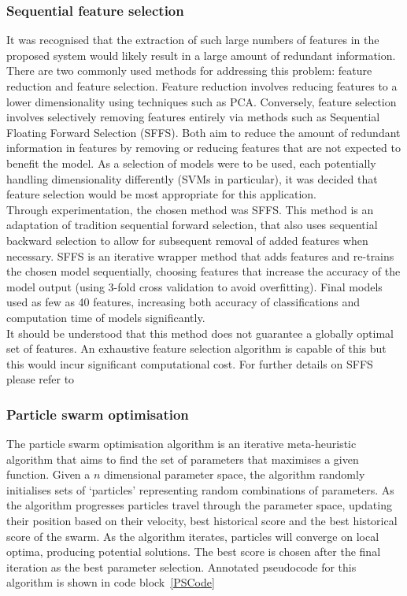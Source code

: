 \documentclass[titlepage, 12pt]{scrartcl} \usepackage{enumitem}
\begin{document}
\subsubsection{Sequential feature selection}\label{SFS}
It was recognised that the extraction of such large numbers of features in the
proposed system would likely result in a large amount of redundant information.
There are two commonly used methods for addressing this problem: feature
reduction and feature selection. Feature reduction involves reducing features
to a lower dimensionality using techniques such as PCA. Conversely, feature
selection involves selectively removing features entirely via methods such as
Sequential Floating Forward Selection (SFFS). Both aim to reduce the amount of
redundant information in features by removing or reducing features that are not
expected to benefit the model. As a selection of models were to be used, each
potentially handling dimensionality differently (SVMs in particular), it was
decided that feature selection would be most appropriate for this
application.\\

Through experimentation, the chosen method was SFFS. This method is an adaptation
of tradition sequential forward selection, that also uses sequential backward
selection to allow for subsequent removal of added features when necessary.
SFFS is an iterative wrapper method that adds features and re-trains the chosen
model sequentially, choosing features that increase the accuracy of the model
output (using 3-fold cross validation to avoid overfitting). Final models used
as few as 40 features, increasing both accuracy of classifications and
computation time of models significantly.\\
It should be understood that this method does not guarantee a globally optimal
set of features. An exhaustive feature selection algorithm is capable of this
but this would incur significant computational cost. For further details on
SFFS please refer to~\parencite[p.3]{Ferri1994}

\subsubsection{Particle swarm optimisation}\label{PSOp}
The particle swarm optimisation algorithm is an iterative meta-heuristic algorithm that
aims to find the set of parameters that maximises a given function. Given a
$n$ dimensional parameter space, the algorithm randomly initialises sets of
`particles' representing random combinations of parameters. As the algorithm
progresses particles travel through the parameter space, updating their
position based on their velocity, best historical score and the best historical
score of the swarm. As the algorithm iterates, particles will converge on local
optima, producing potential solutions. The best score is chosen after the final
iteration as the best parameter selection. Annotated pseudocode for this
algorithm is shown in code block~\ref{PSCode}~\parencite{Clerc2002}
\end{document}
